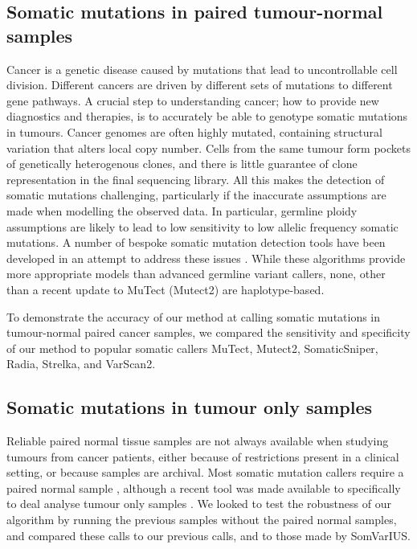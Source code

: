 \documentclass[notitlepage, twocolumn]{article}
\begin{document}
\subsection*{Somatic mutations in paired tumour-normal samples}

Cancer is a genetic disease caused by mutations that lead to uncontrollable cell division. Different cancers are driven by different sets of mutations to different gene pathways. A crucial step to understanding cancer; how to provide new diagnostics and therapies, is to accurately be able to genotype somatic mutations in tumours. Cancer genomes are often highly mutated, containing structural variation that alters local copy number. Cells from the same tumour form pockets of genetically heterogenous clones, and there is little guarantee of clone representation in the final sequencing library. All this makes the detection of somatic mutations challenging, particularly if the inaccurate assumptions are made when modelling the observed data. In particular, germline ploidy assumptions are likely to lead to low sensitivity to low allelic frequency somatic mutations. A number of bespoke somatic mutation detection tools have been developed in an attempt to address these issues \cite{RN142, RN146, RN150, RN143, RN145}. While these algorithms provide more appropriate models than advanced germline variant callers, none, other than a recent update to MuTect (Mutect2) are haplotype-based.

To demonstrate the accuracy of our method at calling somatic mutations in tumour-normal paired cancer samples, we compared the sensitivity and specificity of our method to popular somatic callers MuTect, Mutect2, SomaticSniper, Radia, Strelka, and VarScan2.

\subsection*{Somatic mutations in tumour only samples}

Reliable paired normal tissue samples are not always available when studying tumours from cancer patients, either because of restrictions present in a clinical setting, or because samples are archival. Most somatic mutation callers require a paired normal sample \cite{RN142, RN146, RN150, RN143, RN145}, although a recent tool was made available to specifically to deal analyse tumour only samples \cite{RN161}. We looked to test the robustness of our algorithm by running the previous samples without the paired normal samples, and compared these calls to our previous calls, and to those made by SomVarIUS.
\end{document}
